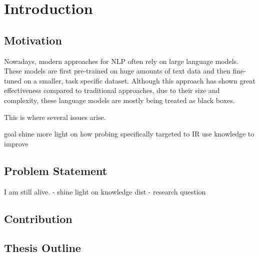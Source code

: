 \chapter{Introduction}

\section{Motivation}
Nowadays, modern approaches for NLP often rely on large language models. These models are first pre-trained on huge amounts of text data and then fine-tuned on a smaller, task specific dataset. Although this approach has shown great effectiveness compared to traditional approaches, due to their size and complexity, these language models are mostly being treated as black boxes.

This is where several issues arise.

goal
shine more light on how
probing specifically targeted to IR
use knowledge to improve



\section{Problem Statement}
I am still alive.
- shine light on knowledge dist
- research question
\section{Contribution}

\section{Thesis Outline}

